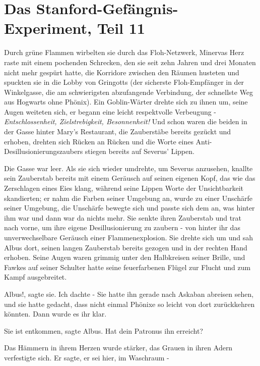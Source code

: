 \chapter{Das Stanford-Gefängnis-Experiment, Teil 11}

Durch grüne Flammen wirbelten sie durch das Floh-Netzwerk, Minervas Herz raste
mit einem pochenden Schrecken, den sie seit zehn Jahren und drei Monaten nicht
mehr gespürt hatte, die Korridore zwischen den Räumen husteten und spuckten sie
in die Lobby von Gringotts (der sicherste Floh-Empfänger in der Winkelgasse, die
am schwierigsten abzufangende Verbindung, der schnellste Weg aus Hogwarts ohne
Phönix). Ein Goblin-Wärter drehte sich zu ihnen um, seine Augen weiteten sich,
er begann eine leicht respektvolle Verbeugung - \emph{Entschlossenheit,
Zielstrebigkeit, Besonnenheit!} Und schon waren die beiden in der Gasse hinter
Mary's Restaurant, die Zauberstäbe bereits gezückt und erhoben, drehten sich
Rücken an Rücken und die Worte eines Anti-Desillusionierungszaubers stiegen
bereits auf Severus' Lippen.

Die Gasse war leer. Als sie sich wieder umdrehte, um Severus anzusehen, knallte
sein Zauberstab bereits mit einem Geräusch auf seinen eigenen Kopf, das wie das
Zerschlagen eines Eies klang, während seine Lippen Worte der Unsichtbarkeit
skandierten; er nahm die Farben seiner Umgebung an, wurde zu einer Unschärfe
seiner Umgebung, die Unschärfe bewegte sich und passte sich dem an, was hinter
ihm war und dann war da nichts mehr. Sie senkte ihren Zauberstab und trat nach
vorne, um ihre eigene Desillusionierung zu zaubern - von hinter ihr das
unverwechselbare Geräusch einer Flammenexplosion. Sie drehte sich um und sah
Albus dort, seinen langen Zauberstab bereits gezogen und in der rechten Hand
erhoben. Seine Augen waren grimmig unter den Halbkreisen seiner Brille, und
Fawkes auf seiner Schulter hatte seine feuerfarbenen Flügel zur Flucht und zum
Kampf ausgebreitet.

\glqq Albus!\grqq{}, sagte sie. \glqq Ich dachte -\grqq{} Sie hatte ihn gerade
nach Askaban abreisen sehen, und sie hatte gedacht, dass nicht einmal Phönixe so
leicht von dort zurückkehren könnten. Dann wurde es ihr klar.

\glqq Sie ist entkommen\grqq{}, sagte Albus. \glqq Hat dein Patronus ihn
erreicht?\grqq{}

Das Hämmern in ihrem Herzen wurde stärker, das Grauen in ihren Adern verfestigte
sich. \glqq Er sagte, er sei hier, im Waschraum -\grqq{}

